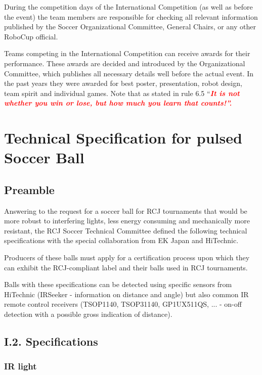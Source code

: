\documentclass{article}
\begin{document}
During the competition days of the International Competition (as well as before
the event) the team members are responsible for checking all relevant
information published by the Soccer Organizational Committee, General Chairs,
or any other RoboCup official.

Teams competing in the International Competition can receive awards for their
performance. These awards are decided and introduced by the Organizational
Committee, which publishes all necessary details well before the actual event.
In the past years they were awarded for best poster, presentation, robot
design, team spirit and individual games. Note that as stated in rule 6.5
``\textbf{\textit{\textcolor{red}{It is not whether you win or lose, but how
much you learn that counts!''.}}}

\appendix
\section{Technical Specification for pulsed Soccer Ball\label{ref-pulsed-spec}}

\subsection{Preamble}

Answering to the request for a soccer ball for RCJ tournaments that would be
more robust to interfering lights, less energy consuming and mechanically more
resistant, the RCJ Soccer Technical Committee defined the following technical
specifications with the special collaboration from EK Japan and HiTechnic.

Producers of these balls must apply for a certification process upon which they
can exhibit the RCJ-compliant label and their balls used in RCJ tournaments.

Balls with these specifications can be detected using specific sensors from
HiTechnic (IRSeeker - information on distance and angle) but also common IR
remote control receivers (TSOP1140, TSOP31140, GP1UX511QS, ... - on-off
detection with a possible gross indication of distance).

\subsection{I.2. Specifications}

\subsubsection{IR light}
\end{document}
